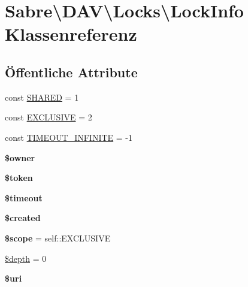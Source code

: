 \hypertarget{class_sabre_1_1_d_a_v_1_1_locks_1_1_lock_info}{}\section{Sabre\textbackslash{}D\+AV\textbackslash{}Locks\textbackslash{}Lock\+Info Klassenreferenz}
\label{class_sabre_1_1_d_a_v_1_1_locks_1_1_lock_info}
\subsection*{Öffentliche Attribute}
\begin{DoxyCompactItemize}
\item 
const \mbox{\hyperlink{class_sabre_1_1_d_a_v_1_1_locks_1_1_lock_info_ac431119be874581bbcc74ff0e8ae5d28}{S\+H\+A\+R\+ED}} = 1
\item 
const \mbox{\hyperlink{class_sabre_1_1_d_a_v_1_1_locks_1_1_lock_info_aae11caee7a94dd4493602e92f1901fb5}{E\+X\+C\+L\+U\+S\+I\+VE}} = 2
\item 
const \mbox{\hyperlink{class_sabre_1_1_d_a_v_1_1_locks_1_1_lock_info_a0a610ef3a049cbf84a470affcf5e3a62}{T\+I\+M\+E\+O\+U\+T\+\_\+\+I\+N\+F\+I\+N\+I\+TE}} = -\/1
\item 
\mbox{\label{class_sabre_1_1_d_a_v_1_1_locks_1_1_lock_info_ac5e148ccd9dc0aea48d26e2208e19c7f}} 
{\bfseries \$owner}
\item 
\mbox{\label{class_sabre_1_1_d_a_v_1_1_locks_1_1_lock_info_a7a590966031d45c330109eef169c9042}} 
{\bfseries \$token}
\item 
\mbox{\label{class_sabre_1_1_d_a_v_1_1_locks_1_1_lock_info_a0e81a185297ad1294581b210ee66df9b}} 
{\bfseries \$timeout}
\item 
\mbox{\label{class_sabre_1_1_d_a_v_1_1_locks_1_1_lock_info_a2b792a2a4aa29df24438216a21f2ea12}} 
{\bfseries \$created}
\item 
\mbox{\label{class_sabre_1_1_d_a_v_1_1_locks_1_1_lock_info_a2ffb35a37cfc544962acd93f7f840f3f}} 
{\bfseries \$scope} = self\+::\+E\+X\+C\+L\+U\+S\+I\+VE
\item 
\mbox{\hyperlink{class_sabre_1_1_d_a_v_1_1_locks_1_1_lock_info_af6f76a5fc009988673591a39eb86db04}{\$depth}} = 0
\item 
\mbox{\label{class_sabre_1_1_d_a_v_1_1_locks_1_1_lock_info_a38d7704ad8b3013ac8dfd6545ff2f31d}} 
{\bfseries \$uri}
\end{DoxyCompactItemize}


